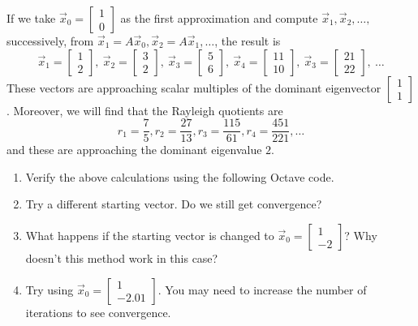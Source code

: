 \documentclass{ximera}
\begin{document}
\begin{exploration}
  
If we take $\vec{x}_{0} = \left[ \begin{array}{rr}
  1 \\
  0
  \end{array}\right]$ as the first approximation and compute $\vec{x}_{1}, \vec{x}_{2}, \dots,$ successively, from $\vec{x}_{1} = A\vec{x}_{0}, \vec{x}_{2} = A\vec{x}_{1}, \dots$, the result is
\begin{equation*}
\vec{x}_{1} = \left[ \begin{array}{rr}
1 \\
2
\end{array}\right], \
\vec{x}_{2} = \left[ \begin{array}{rr}
3 \\
2
\end{array}\right], \
\vec{x}_{3} = \left[ \begin{array}{rr}
5 \\
6
\end{array}\right], \
\vec{x}_{4} = \left[ \begin{array}{rr}
11 \\
10
\end{array}\right], \
\vec{x}_{3} = \left[ \begin{array}{rr}
21 \\
22
\end{array}\right], \ \dots
\end{equation*}
These vectors are approaching scalar multiples of the dominant eigenvector $\left[ \begin{array}{rr}
1 \\
1
\end{array}\right]$. Moreover, we will find that the Rayleigh quotients are
\begin{equation*}
r_{1} = \frac{7}{5}, r_{2} = \frac{27}{13}, r_{3} = \frac{115}{61}, r_{4} = \frac{451}{221}, \dots
\end{equation*}
and these are approaching the dominant eigenvalue $2$.

\begin{enumerate}
    \item\label{exp:2x2PowerMethod_a} Verify the above calculations using the following Octave code.
    \item\label{exp:2x2PowerMethod_b} Try a different starting vector.  Do we still get convergence?
    \item\label{exp:2x2PowerMethod_c} What happens if the starting vector is changed to $\vec{x}_{0} = \left[ \begin{array}{rr}
  1 \\
  -2
  \end{array}\right]$?  Why doesn't this method work in this case?
  \item\label{exp:2x2PowerMethod_d} Try using $\vec{x}_{0} = \left[ \begin{array}{rr}
  1 \\
  -2.01
  \end{array}\right]$.  You may need to increase the number of iterations to see convergence.
\end{enumerate}


\end{exploration}
\end{document}
